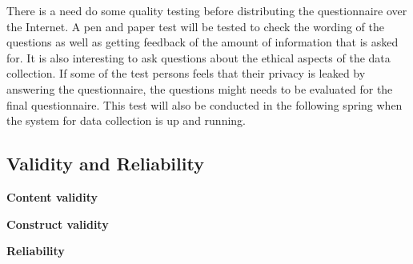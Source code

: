     There is a need do some quality testing before distributing the questionnaire over the Internet. A pen and paper test will be tested to check the wording of the questions as well as getting feedback of the amount of information that is asked for. It is also interesting to ask questions about the ethical aspects of the data collection. If some of the test persons feels that their privacy is leaked by answering the questionnaire, the questions might needs to be evaluated for the final questionnaire. 
    This test will also be conducted in the following spring when the system for data collection is up and running. 


  \subsection{Validity and Reliability}\label{sec:validityandreliability}

    {\bf Content validity}

    {\bf Construct validity}

    {\bf Reliability}





